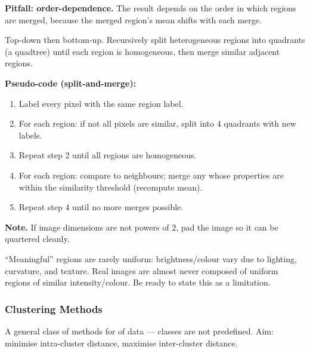 \textbf{Pitfall: order-dependence.} The result depends on the order in which regions are merged, because the merged region's mean shifts with each merge.

\separator

\begin{defbox}
Top-down then bottom-up. Recursively split heterogeneous regions into quadrants (a quadtree) until each region is homogeneous, then merge similar adjacent regions.
\end{defbox}

\textbf{Pseudo-code (split-and-merge):}
\begin{enumerate}
  \item Label every pixel with the same region label.
  \item For each region: if not all pixels are similar, split into 4 quadrants with new labels.
  \item Repeat step 2 until all regions are homogeneous.
  \item For each region: compare to neighbours; merge any whose properties are within the similarity threshold (recompute mean).
  \item Repeat step 4 until no more merges possible.
\end{enumerate}

\textbf{Note.} If image dimensions are not powers of 2, pad the image so it can be quartered cleanly.

\separator

\begin{tipbox}
``Meaningful'' regions are rarely uniform: brightness/colour vary due to lighting, curvature, and texture. Real images are almost never composed of uniform regions of similar intensity/colour. Be ready to state this as a limitation.
\end{tipbox}

\bigseparator

\subsubsection{Clustering Methods}

\begin{defbox}[Clustering]
A general class of methods for  of data --- classes are not predefined. Aim: minimise intra-cluster distance, maximise inter-cluster distance.
\end{defbox}

